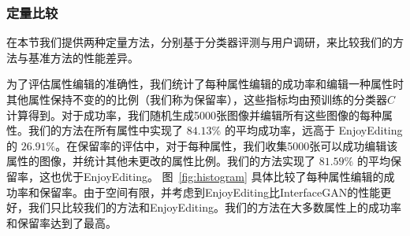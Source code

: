 \subsubsection{定量比较}
在本节我们提供两种定量方法，分别基于分类器评测与用户调研，来比较我们的方法与基准方法的性能差异。

为了评估属性编辑的准确性，我们统计了每种属性编辑的成功率和编辑一种属性时其他属性保持不变的的比例（我们称为保留率），这些指标均由预训练的分类器$C$计算得到。对于成功率，我们随机生成5000张图像并编辑所有这些图像的每种属性。我们的方法在所有属性中实现了 $84.13\%$ 的平均成功率，远高于 En​​joyEditing 的 $26.91\%$。在保留率的评估中，对于每种属性，我们收集5000张可以成功编辑该属性的图像，并统计其他未更改的属性比例。我们的方法实现了 $81.59\%$ 的平均保留率，这也优于EnjoyEditing。 图~\ref{fig:histogram} 具体比较了每种属性编辑的成功率和保留率。由于空间有限，并考虑到EnjoyEditing比InterfaceGAN的性能更好，我们只比较我们的方法和EnjoyEditing。我们的方法在大多数属性上的成功率和保留率达到了最高。

